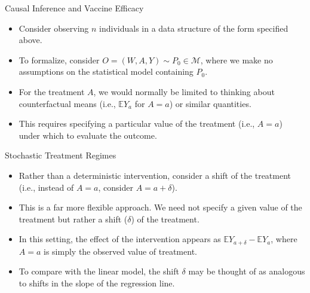\documentclass[12pt,t,handout]{beamer}
\newcommand{\E}{\mathbb{E}}
\begin{document}

\begin{frame}[c]{Causal Inference and Vaccine Efficacy}

\begin{center}
\begin{itemize}
  \itemsep10pt
  \item Consider observing $n$ individuals in a data structure of the form
    specified above.
  \item To formalize, consider $O = (W, A, Y) \sim P_0 \in \mathcal{M}$, where
    we make no assumptions on the statistical model containing $P_0$.
  \item For the treatment $A$, we would normally be limited to thinking about
    counterfactual means (i.e., $\E Y_a$ for $A = a$) or similar quantities.
  \item This requires specifying a particular value of the treatment (i.e.,
    $A = a$) under which to evaluate the outcome.
\end{itemize}
\end{center}

\note{
}

\end{frame}


\begin{frame}[c]{Stochastic Treatment Regimes}

\begin{center}
\begin{itemize}
  \itemsep10pt
  \item Rather than a deterministic intervention, consider a shift of the
    treatment (i.e., instead of $A = a$, consider $A = a + \delta$).
  \item This is a far more flexible approach. We need not specify a given value
    of the treatment but rather a shift ($\delta$) of the treatment.
  \item In this setting, the effect of the intervention appears as $\E Y_{a +
    \delta} - \E Y_a$, where $A = a$ is simply the observed value of
    treatment.
  \item To compare with the linear model, the shift $\delta$ may be thought of
    as analogous to shifts in the slope of the regression line.
\end{itemize}
\end{center}

\note{
}

\end{frame}
\end{document}
